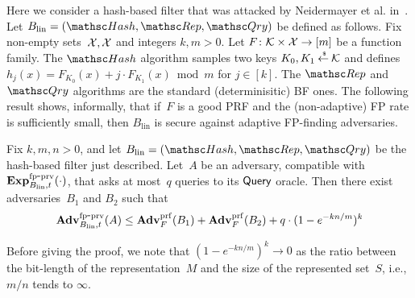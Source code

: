 Here we consider a hash-based filter that was attacked by Neidermayer et al. in~\cite{xxx}.  Let $B_{\mathrm{lin}}=(\Hash,\Rep,\Qry)$ be defined as follows.  Fix non-empty sets~${\cal X}, {\cal X}$ and integers $k,m>0$.  Let $F\colon\mathcal{K} \times {\cal X} \to [m]$ be a function family.  The $\Hash$ algorithm samples two keys $K_0,K_1 {\:\stackrel{{\scriptscriptstyle \hspace{0.2em}\$}} {\leftarrow}\:} \mathcal{K}$ and defines $h_j(x) = F_{K_0}(x) + j\cdot F_{K_1}(x) \bmod m$ for $j \in [k]$.  The $\Rep$ and $\Qry$ algorithms are the standard (determinisitic) BF ones.   The following result shows, informally, that if~$F$ is a good PRF and the (non-adaptive) FP rate is sufficiently small, then $B_\mathrm{lin}$ is secure against adaptive FP-finding adversaries.

\begin{theorem}\label{thm1}
Fix $k,m,n>0$, and let $B_\mathrm{lin}=(\Hash,\Rep,\Qry)$ be the hash-based filter just described. 
Let~$A$ be an adversary, compatible with $\mathrm{\mathbf{Exp}}^{\mathrm{fp\mbox{-}prv}}_{B_\mathrm{lin},t}(\cdot)$, that asks at most~$q$ queries to its $\mathsf{Query}$ oracle.  Then there exist adversaries~$B_1$ and $B_2$ such that
\[
\mathrm{\mathbf{Adv}}^{\mathrm{fp\mbox{-}prv}}_{B_{\mathrm{lin}},t}(A) \leq  \mathbf{Adv}^{\mathrm{prf}}_{F}(B_1) + \mathbf{Adv}^{\mathrm{prf}}_{F}(B_2) + q \cdot  (1-e^{-kn/m})^k
\]
\end{theorem}
Before giving the proof, we note that  $(1-e^{-kn/m})^k \rightarrow 0$ as the ratio between the bit-length of the representation~$M$ and the size of the represented set~$S$, i.e.,$m/n$ tends to $\infty$.
%
